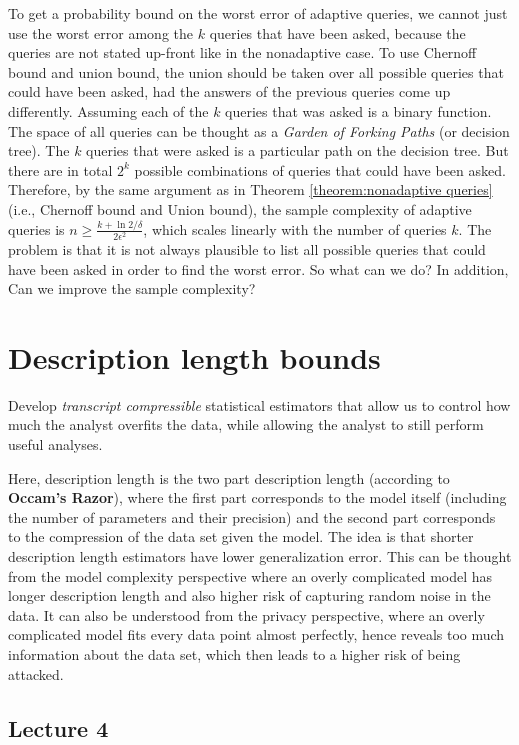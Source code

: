 \documentclass[]{article}
\begin{document}
To get a probability bound on the worst error of adaptive queries, we cannot just use the worst error among the $k$ queries that have been asked, because the queries are not stated up-front like in the nonadaptive case. To use Chernoff bound and union bound, the union should be taken over all possible queries that could have been asked, had the answers of the previous queries come up differently. Assuming each of the $k$ queries that was asked is a binary function. The space of all queries can be thought as a \textit{Garden of Forking Paths} (or decision tree). The $k$ queries that were asked is a particular path on the decision tree. But there are in total $2^k$ possible combinations of queries that could have been asked. Therefore, by the same argument as in Theorem \ref{theorem:nonadaptive queries} (i.e., Chernoff bound and Union bound), the sample complexity of adaptive queries is $n \ge \frac{k + \ln 2 / \delta}{2\epsilon^2}$, which scales linearly with the number of queries $k$. The problem is that it is not always plausible to list all possible queries that could have been asked in order to find the worst error. So what can we do? In addition, Can we improve the sample complexity?


\section{Description length bounds}

Develop \textit{transcript compressible} statistical estimators that allow us to control how much the analyst overfits the data, while allowing the analyst to still perform useful analyses. 

Here, description length is the two part description length (according to \textbf{Occam's Razor}), where the first part corresponds to the model itself (including the number of parameters and their precision) and the second part corresponds to the compression of the data set given the model. The idea is that shorter description length estimators have lower generalization error. This can be thought from the model complexity perspective where an overly complicated model has longer description length and also higher risk of capturing random noise in the data. It can also be understood from the privacy perspective, where an overly complicated model fits every data point almost perfectly, hence reveals too much information about the data set, which then leads to a higher risk of being attacked. 

\subsection{Lecture 4}
 
\end{document}
